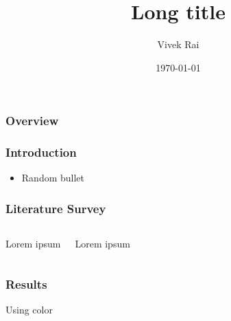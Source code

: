 \documentclass{beamer}
\title[Short title]{Long title} %
\author{Vivek Rai} %
\institute[IIT Kharagpur] %
{
Indian Institute of Technology Kharagpur\\ %
\medskip
\textit{xtinct@protonmail.com} %
}
\date{\today} %
\begin{document}
\begin{frame}
\titlepage %
\end{frame}

\begin{frame}
\frametitle{Overview} %
\tableofcontents %
\end{frame}



\begin{frame}
\frametitle{Introduction}
\begin{itemize}
  \item Random bullet
\end{itemize}
\end{frame}


\begin{frame}
  \frametitle{Literature Survey}
\begin{columns}[c] %

Lorem ipsum

Lorem ipsum

\end{columns}
\end{frame}


\begin{frame}[fragile]
\frametitle{Results}


\color{Fern} Using color
\end{frame}
\end{document}
